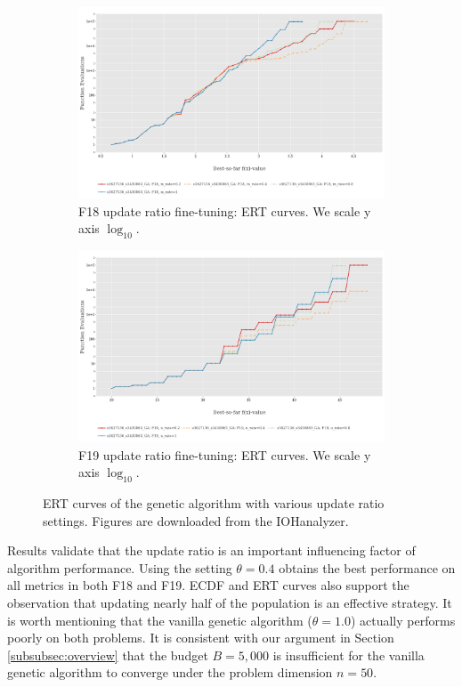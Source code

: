 \documentclass{article}
\begin{document}
\begin{figure}[!ht]
    \begin{subfigure}[h]{0.95\linewidth}
        \includegraphics[width=\linewidth]{ga/f18/urate_ert.png}
        \caption{F18 update ratio fine-tuning: ERT curves. We scale y axis $\log_{10}$.}
    \end{subfigure}
    \hfill
    \begin{subfigure}[h]{0.95\linewidth}
        \includegraphics[width=\linewidth]{ga/f19/urate_ert.png}
        \caption{F19 update ratio fine-tuning: ERT curves. We scale y axis $\log_{10}$.}
    \end{subfigure}
    \caption{ERT curves of the genetic algorithm with various update ratio settings. Figures are downloaded from the IOHanalyzer.}
    \label{fig:experi-ga-urate-ert}
\end{figure}

Results validate that the update ratio is an important influencing factor of algorithm performance. Using the setting $\theta = 0.4$ obtains the best performance on all metrics in both F18 and F19. ECDF and ERT curves also support the observation that updating nearly half of the population is an effective strategy. It is worth mentioning that the vanilla genetic algorithm ($\theta = 1.0$) actually performs poorly on both problems. It is consistent with our argument in Section \ref{subsubsec:overview} that the budget $B = 5,000$ is insufficient for the vanilla genetic algorithm to converge under the problem dimension $n = 50$.
\end{document}
